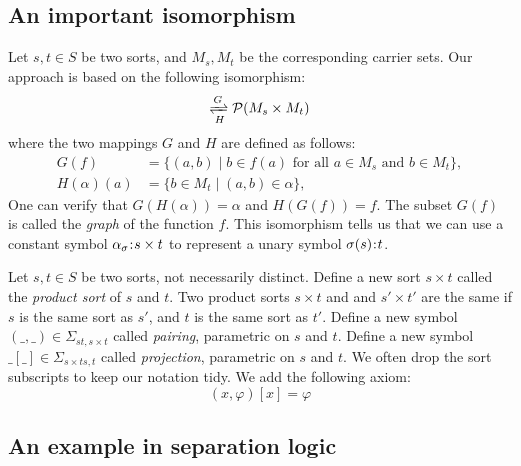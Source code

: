 \documentclass{amsart}
\begin{document}
\subsection{An important isomorphism}
Let $s, t \in S$ be two sorts,
and $M_s, M_t$ be the corresponding carrier sets.
Our approach is based on the following isomorphism:
\begin{equation}
[M_s \to \pset{M_t}]
\xrightleftharpoons[H]{G}
\pset{M_s \times M_t}
\end{equation}
where the two mappings $G$ and $H$ are defined as follows:
\begin{align}
G(f) &= \{ (a,b) \mid b \in f(a) 
\text{ for all $a \in M_s$ and $b \in M_t$} \}, \\
H(\alpha)(a) &= \{ b \in M_t \mid (a,b) \in \alpha \},
\end{align}
One can verify that $G(H(\alpha)) = \alpha$ and $H(G(f)) = f$.
The subset $G(f)$ is called the \emph{graph} of the function $f$.
This isomorphism tells us that we can use a constant symbol
$\alpha_\sigma \mathbin{\!:\!} s \times t$ to represent a unary symbol
$\sigma (s) \mathbin{\!:\!} t$.

\begin{definition}
Let $s, t \in S$ be two sorts, not necessarily distinct.
Define a new sort $s \times t$ called the \emph{product sort}
of $s$ and $t$.
Two product sorts $s \times t$ and
and $s' \times t'$ are the same if
$s$ is the same sort as $s'$, and $t$ is the same sort as  $t'$.
Define a new symbol $(\_,\_) \in \Sigma_{s t , s \times t}$
called \emph{pairing}, parametric on $s$ and $t$.
Define a new symbol $\_[\_] \in \Sigma_{s \times t s , t}$
called \emph{projection}, parametric on $s$ and $t$.
We often drop the sort subscripts to keep our notation tidy.
We add the following axiom:
\begin{equation}
(x,\varphi)[x] = \varphi
\end{equation}
\end{definition}

\subsection{An example in separation logic}
\end{document}
